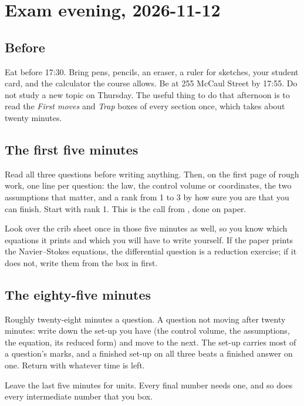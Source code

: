 \section{Exam evening, 2026-11-12}
\label{sec:examevening}

\subsection*{Before}

Eat before 17:30. Bring pens, pencils, an eraser, a ruler for sketches, your student card, and the calculator the course allows. Be at 255 McCaul Street by 17:55. Do not study a new topic on Thursday. The useful thing to do that afternoon is to read the \emph{First moves} and \emph{Trap} boxes of every section once, which takes about twenty minutes.

\subsection*{The first five minutes}

Read all three questions before writing anything. Then, on the first page of rough work, one line per question: the law, the control volume or coordinates, the two assumptions that matter, and a rank from 1 to 3 by how sure you are that you can finish. Start with rank 1. This is the call from , done on paper.

Look over the crib sheet once in those five minutes as well, so you know which equations it prints and which you will have to write yourself. If the paper prints the Navier--Stokes equations, the differential question is a reduction exercise; if it does not, write them from the box in  first.

\subsection*{The eighty-five minutes}

Roughly twenty-eight minutes a question. A question not moving after twenty minutes: write down the set-up you have (the control volume, the assumptions, the equation, its reduced form) and move to the next. The set-up carries most of a question's marks, and a finished set-up on all three beats a finished answer on one. Return with whatever time is left.

Leave the last five minutes for units. Every final number needs one, and so does every intermediate number that you box.

